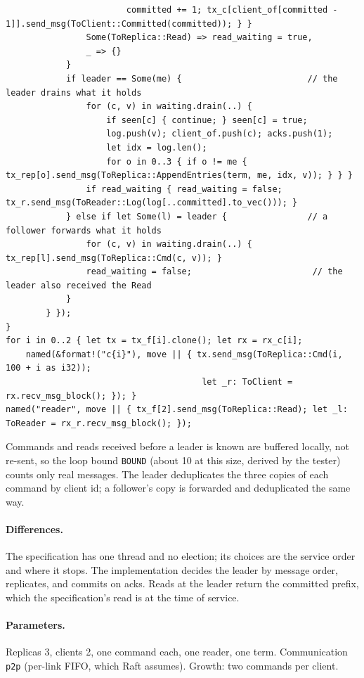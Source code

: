 \documentclass[11pt,a4paper]{article}
\newcommand{\code}[1]{\texttt{#1}}
\begin{document}
\begin{lstlisting}
                        committed += 1; tx_c[client_of[committed - 1]].send_msg(ToClient::Committed(committed)); } }
                Some(ToReplica::Read) => read_waiting = true,
                _ => {}
            }
            if leader == Some(me) {                         // the leader drains what it holds
                for (c, v) in waiting.drain(..) {
                    if seen[c] { continue; } seen[c] = true;
                    log.push(v); client_of.push(c); acks.push(1);
                    let idx = log.len();
                    for o in 0..3 { if o != me { tx_rep[o].send_msg(ToReplica::AppendEntries(term, me, idx, v)); } } }
                if read_waiting { read_waiting = false; tx_r.send_msg(ToReader::Log(log[..committed].to_vec())); }
            } else if let Some(l) = leader {                // a follower forwards what it holds
                for (c, v) in waiting.drain(..) { tx_rep[l].send_msg(ToReplica::Cmd(c, v)); }
                read_waiting = false;                        // the leader also received the Read
            }
        } });
}
for i in 0..2 { let tx = tx_f[i].clone(); let rx = rx_c[i];
    named(&format!("c{i}"), move || { tx.send_msg(ToReplica::Cmd(i, 100 + i as i32));
                                       let _r: ToClient = rx.recv_msg_block(); }); }
named("reader", move || { tx_f[2].send_msg(ToReplica::Read); let _l: ToReader = rx_r.recv_msg_block(); });
\end{lstlisting}
Commands and reads received before a leader is known are buffered locally, not re-sent, so
the loop bound \code{BOUND} (about 10 at this size, derived by the tester) counts only real
messages. The leader deduplicates the three copies of each command by client id; a follower's
copy is forwarded and deduplicated the same way.

\paragraph{Differences.} The specification has one thread and no election; its choices are the
service order and where it stops. The implementation decides the leader by message order,
replicates, and commits on acks. Reads at the leader return the committed prefix, which the
specification's read is at the time of service.

\paragraph{Parameters.} Replicas 3, clients 2, one command each, one reader, one term.
Communication \code{p2p} (per-link FIFO, which Raft assumes). Growth: two commands per client.
\end{document}
